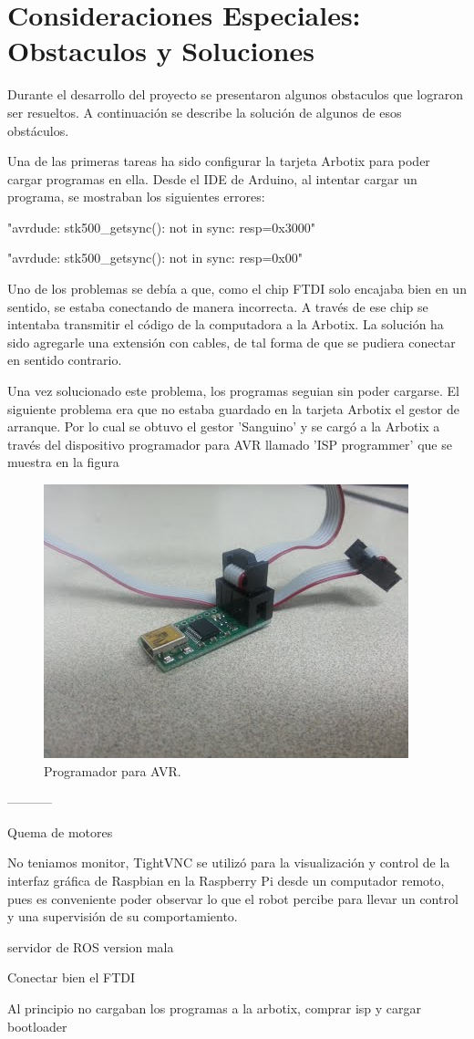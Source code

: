 \chapter{Consideraciones Especiales: Obstaculos y Soluciones} \label{chapter:consideraciones}

Durante el desarrollo del proyecto se presentaron algunos obstaculos que lograron ser resueltos. A continuación se describe la solución de algunos de esos obstáculos. 

Una de las primeras tareas ha sido configurar la tarjeta Arbotix para poder cargar programas en ella. Desde el IDE de Arduino, al intentar cargar un programa, se mostraban los siguientes errores:

"avrdude: stk500\_getsync(): not in sync: resp=0x3000"

"avrdude: stk500\_getsync(): not in sync: resp=0x00"

Uno de los problemas se debía a que, como el chip FTDI solo encajaba bien en un sentido, se estaba conectando de manera incorrecta. A través de ese chip se intentaba transmitir el código de la computadora a la Arbotix. La solución ha sido agregarle una extensión con cables, de tal forma de que se pudiera conectar en sentido contrario. 

Una vez solucionado este problema, los programas seguian sin poder cargarse. El siguiente problema era que no estaba guardado en la tarjeta Arbotix el gestor de arranque. Por lo cual se obtuvo el gestor 'Sanguino' y se cargó a la Arbotix a través del dispositivo programador para AVR llamado 'ISP programmer' que se muestra en la figura 

\begin{figure}[hbtp]
\centering
\includegraphics[scale=0.3]{imagenes/ISP.jpg}
\caption{Programador para AVR.}
\label{fig:trasera1}
\end{figure}

-----------


Quema de motores 

No teniamos monitor, TightVNC se utilizó para la visualización y control de la interfaz gráfica de Raspbian en la Raspberry Pi desde un computador remoto, pues es conveniente poder observar lo que el robot percibe para llevar un control y una supervisión de su comportamiento.

servidor de ROS version mala

Conectar bien el FTDI

Al principio no cargaban los programas a la arbotix, comprar isp y cargar bootloader
